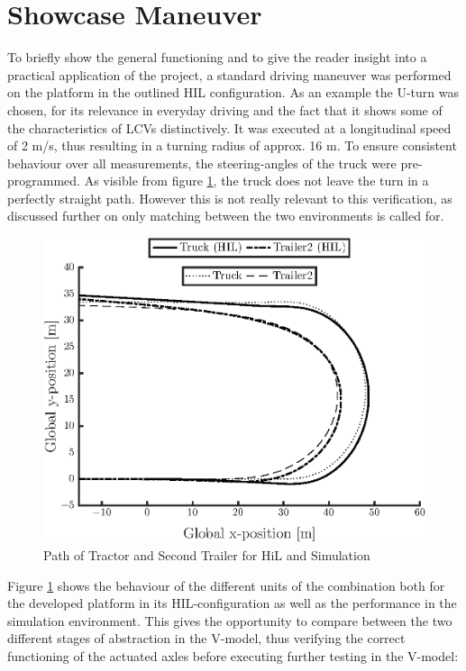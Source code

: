 \documentclass[root.tex]{subfiles}
\begin{document}
	
	{\pagestyle{empty}}
	\section{Showcase Maneuver}
	\label{chap:Showcase_Maneuver}
	To briefly show the general functioning and to give the reader insight into a practical application of the project, a standard driving maneuver was performed on the platform in the outlined \gls{HIL} configuration. As an example the U-turn was chosen, for its relevance in everyday driving and the fact that it shows some of the characteristics of \glspl{LCV} distinctively. It was executed at a longitudinal speed of 2 \unit{m/s}, thus resulting in a turning radius of approx. 16 \unit{m}. To ensure consistent behaviour over all measurements, the steering-angles of the truck were pre-programmed. As visible from figure \ref{fig:Path}, the truck does not leave the turn in a perfectly straight path. However this is not really relevant to this verification, as discussed further on only matching between the two environments is called for.
	
	\begin{figure}[!h]
		
		\includegraphics[width=0.9\linewidth]{xy_HIL_and_VTM}
		\caption[Path of Tractor and Second Trailer for HiL and Simulation]{Path of Tractor and Second Trailer for HiL and Simulation}
		
		\label{fig:Path}
	\end{figure}
	
	
	Figure \ref{fig:Path} shows the behaviour of the different units of the combination both for the developed platform in its \gls{HIL}-configuration as well as the performance in the simulation environment. This gives the opportunity to compare between the two different stages of abstraction in the V-model, thus verifying the correct functioning of the actuated axles before executing further testing in the V-model:
	
\end{document}
